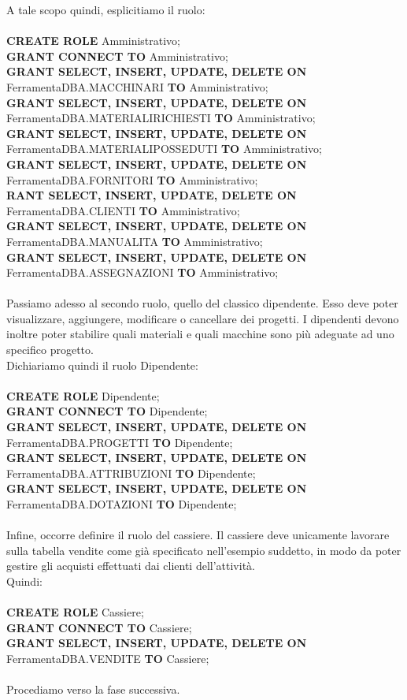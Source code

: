 \documentclass[a4paper,12pt,italian]{article}
\begin{document}
A tale scopo quindi, esplicitiamo il ruolo: \\ \\
\textbf{CREATE ROLE} Amministrativo; \\
\textbf{GRANT CONNECT TO} Amministrativo; \\
\textbf{GRANT SELECT, INSERT, UPDATE, DELETE ON} FerramentaDBA.MACCHINARI \textbf{TO} Amministrativo; \\
\textbf{GRANT SELECT, INSERT, UPDATE, DELETE ON} FerramentaDBA.MATERIALIRICHIESTI \textbf{TO} Amministrativo; \\
\textbf{GRANT SELECT, INSERT, UPDATE, DELETE ON} FerramentaDBA.MATERIALIPOSSEDUTI \textbf{TO} Amministrativo; \\
\textbf{GRANT SELECT, INSERT, UPDATE, DELETE ON} FerramentaDBA.FORNITORI \textbf{TO} Amministrativo; \\
\textbf{RANT SELECT, INSERT, UPDATE, DELETE ON} FerramentaDBA.CLIENTI \textbf{TO} Amministrativo; \\
\textbf{GRANT SELECT, INSERT, UPDATE, DELETE ON} FerramentaDBA.MANUALITA \textbf{TO} Amministrativo; \\
\textbf{GRANT SELECT, INSERT, UPDATE, DELETE ON} FerramentaDBA.ASSEGNAZIONI \textbf{TO} Amministrativo; \\ \\
Passiamo adesso al secondo ruolo, quello del classico dipendente. Esso deve poter visualizzare, aggiungere, modificare o cancellare dei progetti. I dipendenti devono inoltre poter stabilire quali materiali e quali macchine sono più adeguate ad uno specifico progetto. \\
Dichiariamo quindi il ruolo Dipendente: \\ \\
\textbf{CREATE ROLE} Dipendente; \\
\textbf{GRANT CONNECT TO} Dipendente; \\
\textbf{GRANT SELECT, INSERT, UPDATE, DELETE ON} FerramentaDBA.PROGETTI \textbf{TO} Dipendente; \\
\textbf{GRANT SELECT, INSERT, UPDATE, DELETE ON} FerramentaDBA.ATTRIBUZIONI \textbf{TO} Dipendente; \\
\textbf{GRANT SELECT, INSERT, UPDATE, DELETE ON} FerramentaDBA.DOTAZIONI \textbf{TO} Dipendente; \\ \\
Infine, occorre definire il ruolo del cassiere. Il cassiere deve unicamente lavorare sulla tabella vendite come già specificato nell'esempio suddetto, in modo da poter gestire gli acquisti effettuati dai clienti dell'attività.\\ Quindi: \\ \\
\textbf{CREATE ROLE} Cassiere; \\
\textbf{GRANT CONNECT TO} Cassiere; \\
\textbf{GRANT SELECT, INSERT, UPDATE, DELETE ON} FerramentaDBA.VENDITE \textbf{TO} Cassiere; \\ \\
Procediamo verso la fase successiva.
\end{document}
